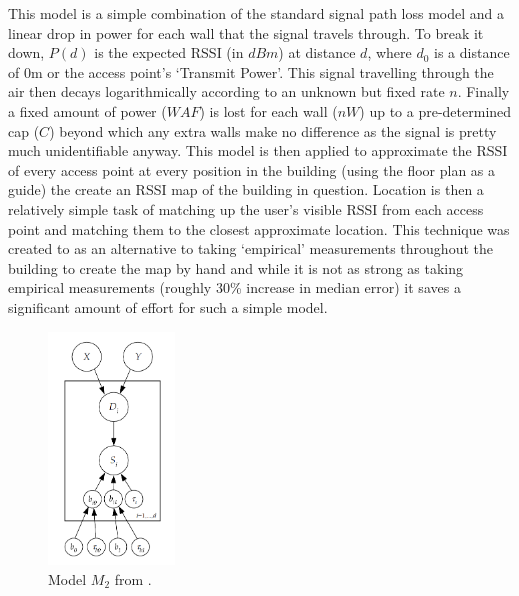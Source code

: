 \documentclass{UoYCSproject}
\begin{document}
                This model is a simple combination of the standard signal path loss model and a linear drop in power for each wall that the signal travels through. To break it down, $P(d)$ is the expected RSSI (in $dBm$) at distance $d$, where $d_0$ is a distance of $0$m or the access point's `Transmit Power'. This signal travelling through the air then decays logarithmically according to an unknown but fixed rate $n$. Finally a fixed amount of power ($WAF$) is lost for each wall ($nW$) up to a pre-determined cap ($C$) beyond which any extra walls make no difference as the signal is pretty much unidentifiable anyway. This model is then applied to approximate the RSSI of every access point at every position in the building (using the floor plan as a guide) the create an RSSI map of the building in question. Location is then a relatively simple task of matching up the user's visible RSSI from each access point and matching them to the closest approximate location. This technique was created to as an alternative to taking `empirical' measurements throughout the building to create the map by hand and while it is not as strong as taking empirical measurements (roughly 30\% increase in median error) it saves a significant amount of effort for such a simple model.
                
                \begin{figure}[h]
                    \label{fig:m2}
                    \caption{Model $M_2$ from \citet{madigan2005bayesian}.}
                    \centering
                        \includegraphics[width=0.3\textwidth]{Model_M2.png}
                \end{figure}
                
\end{document}
